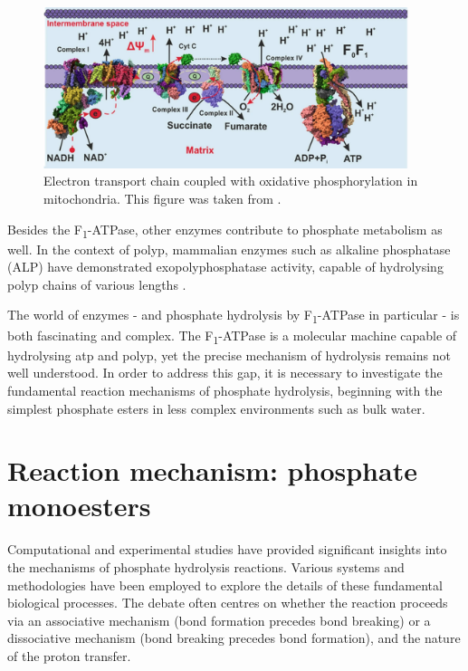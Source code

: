 \begin{figure}[t!]
    \centering
    \includegraphics[width=0.95\textwidth]{Figures/1_Introduction/intro_atp_synthase.pdf}
    \caption{Electron transport chain coupled with oxidative phosphorylation in mitochondria. This figure was taken from \citep{baevInorganicPolyphosphateF0F1ATP2022}.}
    \label{fig:atp_synthase}
\end{figure}

Besides the F\textsubscript{1}-ATPase, other enzymes contribute to phosphate metabolism as well. In the context of \ac{polyp}, mammalian enzymes such as alkaline phosphatase (ALP) have demonstrated exopolyphosphatase activity, capable of hydrolysing \ac{polyp} chains of various lengths \citep{baevInorganicPolyphosphateF0F1ATP2022}.

The world of enzymes - and phosphate hydrolysis by F\textsubscript{1}-ATPase in particular - is both fascinating and complex. The F\textsubscript{1}-ATPase is a molecular machine capable of hydrolysing \ac{atp} and \ac{polyp}, yet the precise mechanism of hydrolysis remains not well understood. In order to address this gap, it is necessary to investigate the fundamental reaction mechanisms of phosphate hydrolysis, beginning with the simplest phosphate esters in less complex environments such as bulk water.



\section{Reaction mechanism: phosphate monoesters}
Computational and experimental studies have provided significant insights into the mechanisms of phosphate hydrolysis reactions. Various systems and methodologies have been employed to explore the details of these fundamental biological processes. The debate often centres on whether the reaction proceeds via an associative mechanism (bond formation precedes bond breaking) or a dissociative mechanism (bond breaking precedes bond formation), and the nature of the proton transfer.



